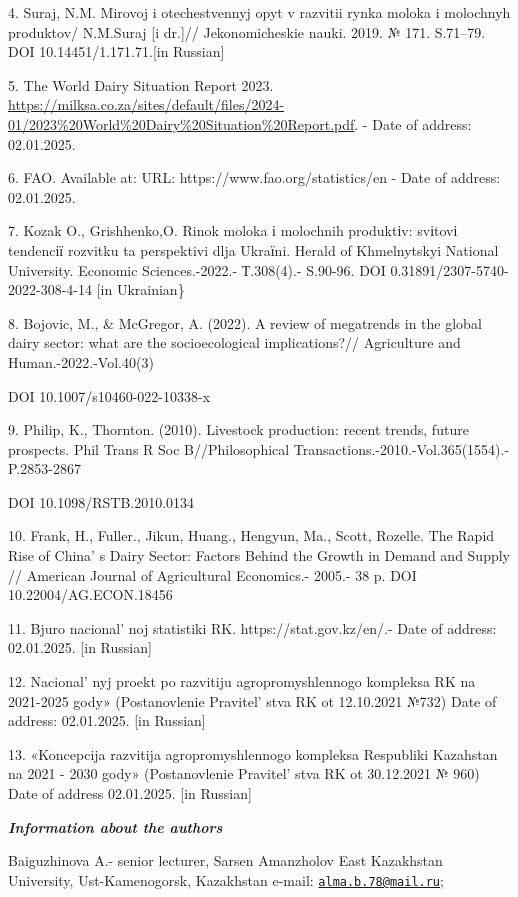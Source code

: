 4. Suraj, N.M. Mirovoj i otechestvennyj opyt v razvitii rynka moloka i
molochnyh produktov/ N.M.Suraj {[}i dr.{]}// Jekonomicheskie nauki.
2019. № 171. S.71--79. DOI 10.14451/1.171.71.{[}in Russian{]}

5. The World Dairy Situation Report 2023.
\url{https://milksa.co.za/sites/default/files/2024-01/2023\%20World\%20Dairy\%20Situation\%20Report.pdf}.
- Date of address: 02.01.2025.

6. FAO. Available at: URL: https://www.fao.org/statistics/en - Date of
address: 02.01.2025.

7. Kozak O., Grishhenko,O. Rinok moloka і molochnih produktіv: svіtovі
tendencії rozvitku ta perspektivi dlja Ukraїni. Herald of Khmelnytskyi
National University. Economic Sciences.-2022.- Т.308(4).- S.90-96. DOI
0.31891/2307-5740-2022-308-4-14 {[}in Ukrainian\}

8. Bojovic, M., \& McGregor, A. (2022). A review of megatrends in the
global dairy sector: what are the socioecological implications?//
Agriculture and Human.-2022.-Vol.40(3)

DOI 10.1007/s10460-022-10338-x

9. Philip, K., Thornton. (2010). Livestock production: recent trends,
future prospects. Phil Trans R Soc B//Philosophical
Transactions.-2010.-Vol.365(1554).-P.2853-2867

DOI 10.1098/RSTB.2010.0134

10. Frank, H., Fuller., Jikun, Huang., Hengyun, Ma., Scott, Rozelle. The
Rapid Rise of China' s Dairy Sector: Factors Behind the
Growth in Demand and Supply // American Journal of Agricultural
Economics.- 2005.- 38 p. DOI 10.22004/AG.ECON.18456

11. Bjuro nacional' noj statistiki RK.
https://stat.gov.kz/en/.- Date of address: 02.01.2025. {[}in Russian{]}

12. Nacional' nyj proekt po razvitiju agropromyshlennogo
kompleksa RK na 2021-2025 gody» (Postanovlenie
Pravitel' stva RK ot 12.10.2021 №732) Date of address:
02.01.2025. {[}in Russian{]}

13. «Koncepcija razvitija agropromyshlennogo kompleksa Respubliki
Kazahstan na 2021 - 2030 gody» (Postanovlenie
Pravitel' stva RK ot 30.12.2021 № 960) Date of address
02.01.2025. {[}in Russian{]}

\emph{{\bfseries Information about the authors}}

Baiguzhinova A.- senior lecturer, Sarsen Amanzholov East Kazakhstan
University, Ust-Kamenogorsk, Kazakhstan e-mail:
\href{mailto:alma.b.78@mail.ru}{\nolinkurl{alma.b.78@mail.ru}};

